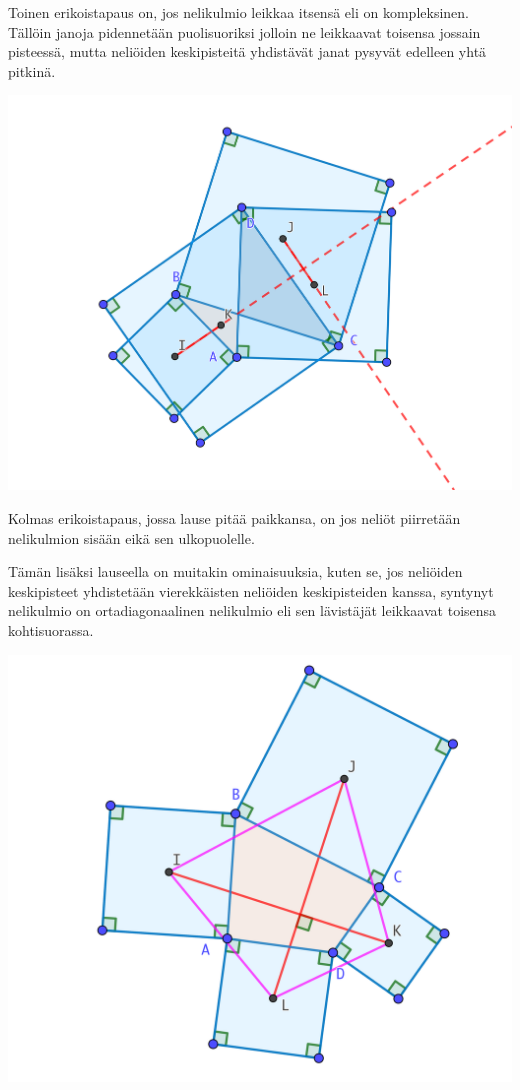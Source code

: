 \documentclass{scrartcl}
\begin{document}
Toinen erikoistapaus on, jos nelikulmio leikkaa itsensä eli on kompleksinen. Tällöin janoja pidennetään puolisuoriksi jolloin ne leikkaavat toisensa jossain pisteessä, mutta neliöiden keskipisteitä yhdistävät janat pysyvät edelleen yhtä pitkinä.
\begin{center}
    \includegraphics[scale=0.15]{konveksi.png}
\end{center}

Kolmas erikoistapaus, jossa lause pitää paikkansa, on jos neliöt piirretään nelikulmion sisään eikä sen ulkopuolelle. 

Tämän lisäksi lauseella on muitakin ominaisuuksia, kuten se, jos neliöiden keskipisteet yhdistetään vierekkäisten neliöiden keskipisteiden kanssa, syntynyt nelikulmio on ortadiagonaalinen nelikulmio eli sen lävistäjät leikkaavat toisensa kohtisuorassa.
\begin{center}
    \includegraphics[scale=0.3]{ortadiagonaali.png}
\end{center}
\end{document}
